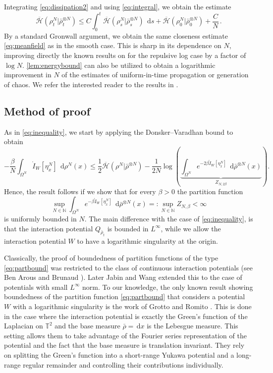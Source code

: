 \documentclass[a4paper,10pt,twoside]{amsart}
\newcommand{\dx}[1]{\,\mathrm{d}#1}  %
\theoremstyle{remark}
\theoremstyle{definition}
\numberwithin{equation}{section}
\newcommand{\T}{\mathbb{T}}
\newcommand{\N}{\mathbb{N}}
\newcommand{\0}{{\bf 0}}
\newcommand{\+}{\hspace{-.5ex}+\hspace{-.5ex}}
\begin{document}
Integrating \eqref{eq:dissipation2} and using \eqref{eq:integral}, we obtain the estimate
\begin{equation}\label{eq:finalestimate}
  \overline{\mathcal{H}}(\rho^N_t|\bar\rho_t^{\otimes N})\le C\int_0^t \overline{\mathcal{H}}(\rho^N_s|\bar\rho_s^{\otimes N})\;\dx{s}+\overline{\mathcal{H}}(\rho^N_0|\bar\rho_0^{\otimes N}) +\frac{C}{N} \, .
\end{equation}
By a standard Gronwall argument, we obtain the same closeness estimate \eqref{eq:meanfield} as in the smooth case. This is sharp in its dependence on $N$, improving directly the known results on for the repulsive log case by a factor of $\log N$. \cref{lem:energybound} can also be utilized to obtain a logarithmic improvement in $N$ of the estimates of uniform-in-time propagation or generation of chaos. We refer the interested reader to the results in \cite{cai2024propagation,rosenzweig2023modulated}.

\subsection{Method of proof} 
As in \eqref{eq:inequality}, we start by applying the Donsker--Varadhan bound to obtain
\begin{equation}
  -\frac{\beta}{N}\int_{\Omega^N}\mathring{I}_W[\eta^N_x]\;\dx \rho^N(x)\le \frac{1}{2}\overline{\mathcal{H}}(\rho^N|\bar\rho^{\otimes N}) -\frac{1}{2N}\log\left(\underbrace{\int_{\Omega^N}e^{-2\beta \mathring{I}_W[\eta^N_x]}\;\dx\bar\rho^{\otimes N}(x)}_{Z_{N,2\beta}}\right).
\end{equation}
Hence, the result follows if we show that for every $\beta>0$ the partition function 
\begin{equation}\label{eq:partbound}
\sup_{N\in\N}\int_{\Omega^N}e^{-\beta \mathring{I}_W[\eta^N_x]}\;\dx\bar\rho^{\otimes N}(x)=:\sup_{N\in\N}Z_{N,\beta}<\infty
\end{equation}
is uniformly bounded in $N$. The main difference with the case of \eqref{eq:inequality}, is that the interaction potential $Q_{\bar\rho_t}$ is bounded in $L^\infty$, while we allow the interaction potential $W$ to have a logarithmic singularity at the origin.


Classically, the proof of boundedness of partition functions of the type \eqref{eq:partbound} was restricted to the class of continuous interaction potentials (see Ben Arous and Brunaud \cite{BenArous1990}). Later Jabin and Wang \cite{Jabin2016} extended this to the case of potentials with small $L^\infty$ norm. To our knowledge, the only known result showing boundedness of the partition function \eqref{eq:partbound} that considers a potential $W$ with a logarithmic singularity is the work of Grotto and Romito \cite{grotto2020central}. This is done in the case where the interaction potential is exactly the Green's function of the Laplacian on $\T^2$ and the base measure $\bar\rho=\dx x$ is the Lebesgue measure.  This setting allows them to take advantage of the Fourier series representation of the potential and the fact that the base measure is translation invariant. They rely on splitting the Green's function into a short-range Yukawa potential and a long-range regular remainder and controlling their contributions individually. 
\end{document}
